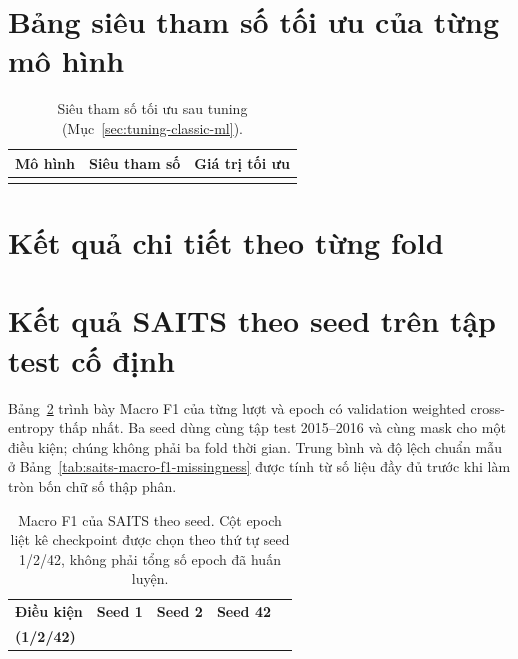 \section{Bảng siêu tham số tối ưu của từng mô hình}
\label{sec:phu-luc-sieu-tham-so}

\begin{table}[H]
\centering
\caption{Siêu tham số tối ưu sau tuning (Mục~\ref{sec:tuning-classic-ml}).}
\label{tab:phu-luc-sieu-tham-so}
\begin{tabular}{@{}lll@{}}
\toprule
\textbf{Mô hình} & \textbf{Siêu tham số} & \textbf{Giá trị tối ưu} \\
\midrule
\TODO{} & \TODO{} & \TODO{} \\
\bottomrule
\end{tabular}
\end{table}

\section{Kết quả chi tiết theo từng fold}
\label{sec:phu-luc-ket-qua-fold}


\section{Kết quả SAITS theo seed trên tập test cố định}
\label{sec:phu-luc-saits-seed}

Bảng~\ref{tab:saits-theo-seed} trình bày Macro F1 của từng lượt và epoch có
validation weighted cross-entropy thấp nhất. Ba seed dùng cùng tập test
2015--2016 và cùng mask cho một điều kiện; chúng không phải ba fold thời gian.
Trung bình và độ lệch chuẩn mẫu ở Bảng~\ref{tab:saits-macro-f1-missingness}
được tính từ số liệu đầy đủ trước khi làm tròn bốn chữ số thập phân.

\begin{table}[H]
\centering
\caption{Macro F1 của SAITS theo seed. Cột epoch liệt kê checkpoint được chọn
theo thứ tự seed 1/2/42, không phải tổng số epoch đã huấn luyện.}
\label{tab:saits-theo-seed}
\begin{tabular}{@{}lcccc@{}}
\toprule
\textbf{Điều kiện} & \textbf{Seed 1} & \textbf{Seed 2} & \textbf{Seed 42}
& \shortstack{\textbf{Epoch tốt nhất}\\\textbf{(1/2/42)}} \\
\midrule

\end{tabular}
\end{table}

